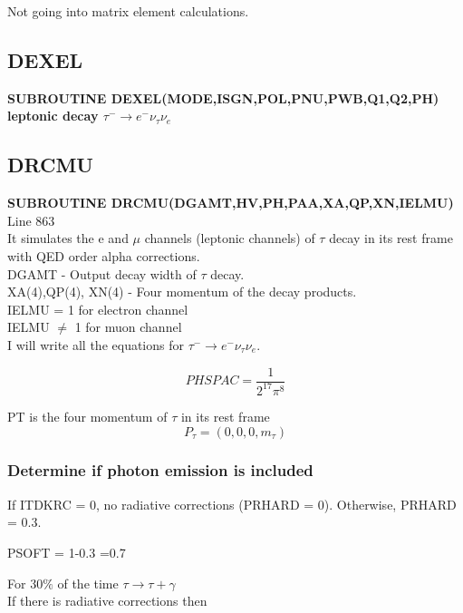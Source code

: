 \documentclass[12pt]{article}
\begin{document}
Not going into matrix element calculations.


\subsection{DEXEL}
\textbf{SUBROUTINE DEXEL(MODE,ISGN,POL,PNU,PWB,Q1,Q2,PH)}\\

\textbf{leptonic decay $\tau^- \rightarrow e^- \nu_\tau \nu_e$}


\subsection{DRCMU}
\textbf{SUBROUTINE DRCMU(DGAMT,HV,PH,PAA,XA,QP,XN,IELMU)}     Line 863\\

It simulates the e and $\mu$ channels (leptonic channels) of $\tau$ decay in its rest frame with QED order alpha corrections.\\

DGAMT - Output decay width of $\tau$ decay.\\
XA(4),QP(4), XN(4) - Four momentum of the decay products.\\


IELMU = 1 for electron channel\\
IELMU $\neq$ 1 for muon channel\\

I will write all the equations for $\tau^- \rightarrow e^- \nu_\tau \nu_e$.

\[PHSPAC = \frac{1}{2^{17}\pi^8} \]

PT is the four momentum of $\tau$ in its rest frame\\

\[P_{\tau} = (0,0,0,m_\tau)\]




\subsubsection{Determine if photon emission is included}

If ITDKRC = 0, no radiative corrections (PRHARD = 0). Otherwise, PRHARD = 0.3.

PSOFT = 1-0.3 =0.7

For 30$\%$ of the time $\tau \rightarrow \tau + \gamma$\\


{\color{red} If there is radiative corrections then }\\
\end{document}
